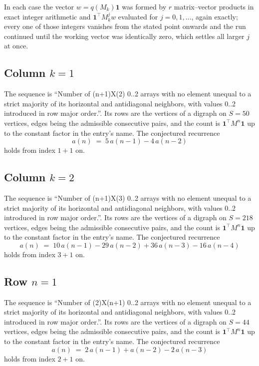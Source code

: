\documentclass[11pt,a4paper]{article}
\theoremstyle{plain}
\theoremstyle{definition}
\begin{document}
In each case the vector $w=q(M_k)\mathbf{1}$ was formed by $r$ matrix--vector products in
exact integer arithmetic and $\mathbf{1}^{\!\top}M_k^{j}w$ evaluated for $j=0,1,\dots$,
again exactly; every one of those integers vanishes from the stated point onwards and the run
continued until the working vector was identically zero, which settles all larger $j$ at once.

\subsection*{Column $k$$=1$}
The sequence is ``Number of (n+1)X(2) 0..2 arrays with no element unequal to a strict majority of its horizontal and antidiagonal neighbors, with values 0..2 introduced in row major order.''. Its rows are the vertices of a digraph on
$S=50$ vertices, edges being the admissible consecutive pairs, and the count is
$\mathbf{1}^{\!\top}M^{n}\mathbf{1}$ up to the constant factor in the entry's name.
The conjectured recurrence
\[
a(n)\;=\;5\,a(n-1) - 4\,a(n-2)
\]
holds from index $1+1$ on.

\subsection*{Column $k$$=2$}
The sequence is ``Number of (n+1)X(3) 0..2 arrays with no element unequal to a strict majority of its horizontal and antidiagonal neighbors, with values 0..2 introduced in row major order.''. Its rows are the vertices of a digraph on
$S=218$ vertices, edges being the admissible consecutive pairs, and the count is
$\mathbf{1}^{\!\top}M^{n}\mathbf{1}$ up to the constant factor in the entry's name.
The conjectured recurrence
\[
a(n)\;=\;10\,a(n-1) - 29\,a(n-2) + 36\,a(n-3) - 16\,a(n-4)
\]
holds from index $3+1$ on.

\subsection*{Row $n$$=1$}
The sequence is ``Number of (2)X(n+1) 0..2 arrays with no element unequal to a strict majority of its horizontal and antidiagonal neighbors, with values 0..2 introduced in row major order.''. Its rows are the vertices of a digraph on
$S=44$ vertices, edges being the admissible consecutive pairs, and the count is
$\mathbf{1}^{\!\top}M^{n}\mathbf{1}$ up to the constant factor in the entry's name.
The conjectured recurrence
\[
a(n)\;=\;2\,a(n-1) + a(n-2) - 2\,a(n-3)
\]
holds from index $2+1$ on.
\end{document}

